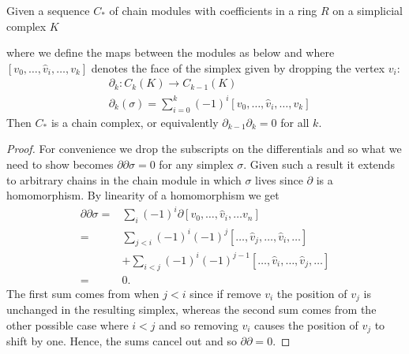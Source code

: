 \begin{theorem}\label{simpchainthm}
Given a sequence $C_{*}$ of chain modules with coefficients in a ring $R$ on a simplicial complex $K$
\begin{center}
\end{center}
where we define the maps between the modules as below and where $[v_{0},\dots,\hat v_{i}, \dots, v_{k}]$ denotes the face of the simplex given by dropping the vertex $v_{i}$:
\begin{align*}
& \partial_{k}:  C_{k}(K) \to C_{k-1}(K) \\
& \partial_{k}(\sigma) =  \sum^{k}_{{i=0}} (-1)^{i} [v_{0},\dots,\hat v_{i}, \dots, v_{k}]
\end{align*}
Then $C_{*}$ is a chain complex, or equivalently $\partial_{k-1}\partial_{k}=0$ for all $k$.
\end{theorem}

\begin{proof}
  For convenience we drop the subscripts on the differentials and so what we need to show becomes $\partial \partial \sigma = 0 $ for any simplex $\sigma$. Given such a result it extends to arbitrary chains in the chain module in which $\sigma$ lives since $\partial$ is a homomorphism. By linearity of a homomorphism we get
  \begin{align*}
    \partial \partial \sigma =& \sum_{i} (-1)^{i} \partial [v_{0}, \dots, \hat v_{i}, \dots v_{n}] \\
    =& \sum_{j < i} (-1)^{i} (-1)^{j} [ \dots,  \hat v_{j}, \dots , \hat v_{i}, \dots ] \\ &+ \sum_{i < j} (-1)^{i} (-1)^{j-1}  [ \dots,  \hat v_{i}, \dots , \hat v_{j}, \dots ] \\
    =& 0.
  \end{align*}
  The first sum comes from when $j<i$ since if remove $v_{i}$ the position of $v_{j}$ is unchanged in the resulting simplex, whereas the second sum comes from the other possible case where $i<j$ and so removing $v_{i}$ causes the position of $v_{j}$ to shift by one. Hence, the sums cancel out and so $\partial \partial = 0$. \end{proof}

